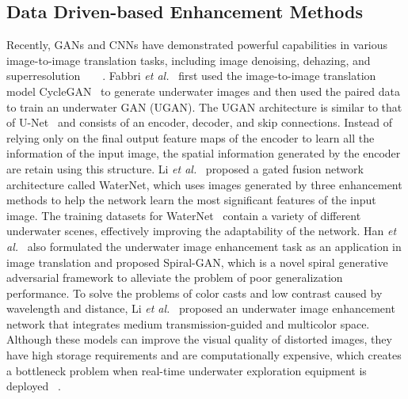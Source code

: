 \documentclass[utf8]{FrontiersinHarvard} %
\begin{document}
\subsection{Data Driven-based Enhancement Methods}
Recently, GANs and CNNs have demonstrated powerful capabilities in various image-to-image translation tasks, including image denoising, dehazing, and superresolution~\citep{2020Practical}~\citep{2020Domain}~\citep{zhang2018image}~\citep{2020Closed}. Fabbri \textit{et al.}~\citep{8460552} first used the image-to-image translation model CycleGAN~\citep{8237506} to generate underwater images and then used the paired data to train an underwater GAN (UGAN). The UGAN architecture is similar to that of U-Net~\citep{2015U} and consists of an encoder, decoder, and skip connections. Instead of relying only on the final output feature maps of the encoder to learn all the information of the input image, the spatial information generated by the encoder are retain using this structure. Li \textit{et al.}~\citep{8917818} proposed a gated fusion network architecture called WaterNet, which uses images generated by three enhancement methods to help the network learn the most significant features of the input image. The training datasets for WaterNet~\citep{8917818} contain a variety of different underwater scenes, effectively improving the adaptability of the network. Han \textit{et al.}~\citep{2020Underwater} also formulated the underwater image enhancement task as an application in image translation and proposed Spiral-GAN, which is a novel spiral generative adversarial framework to alleviate the problem of poor generalization performance. To solve the problems of color casts and low contrast caused by wavelength and distance, Li \textit{et al.}~\citep{2021Underwater} proposed an underwater image enhancement network that integrates medium transmission-guided and multicolor space. Although these models can improve the visual quality of distorted images, they have high storage requirements and are computationally expensive, 
which creates a bottleneck problem when real-time underwater exploration equipment is deployed
~\citep{naik2021shallow}.
\end{document}
